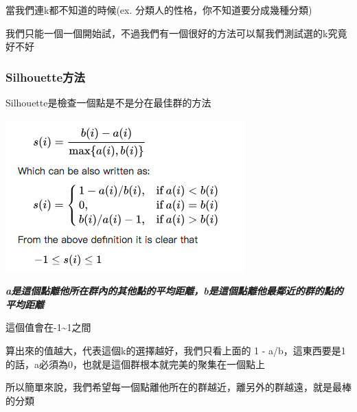 \documentclass[11pt]{ctexart}
\makeatletter
\def\maxwidth{\ifdim\Gin@nat@width>\linewidth\linewidth
    \else\Gin@nat@width\fi}
\let\Oldincludegraphics\includegraphics
\renewcommand{\includegraphics}[1]{\Oldincludegraphics[width=.8\maxwidth]{#1}}
\makeatother
\begin{document}
當我們連k都不知道的時候(ex. 分類人的性格，你不知道要分成幾種分類)

我們只能一個一個開始試，不過我們有一個很好的方法可以幫我們測試選的k究竟好不好

\hypertarget{silhouetteux65b9ux6cd5}{%
\subsubsection{Silhouette方法}\label{silhouetteux65b9ux6cd5}}

Silhouette是檢查一個點是不是分在最佳群的方法

\includegraphics{sihouette.png}

\textbf{\emph{a是這個點離他所在群內的其他點的平均距離，b是這個點離他最鄰近的群的點的平均距離}}

這個值會在-1\textasciitilde{}1之間

算出來的值越大，代表這個k的選擇越好，我們只看上面的 1 -
a/b，這東西要是1的話，a必須為0，也就是這個群根本就完美的聚集在一個點上

所以簡單來說，我們希望每一個點離他所在的群越近，離另外的群越遠，就是最棒的分類
\end{document}
